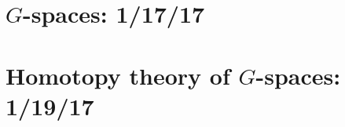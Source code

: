 \documentclass{style_EHT}
\begin{document}
\frontstuff

\section{$G$-spaces: 1/17/17}
	
\section{Homotopy theory of $G$-spaces: 1/19/17}
	



{}

\end{document}
